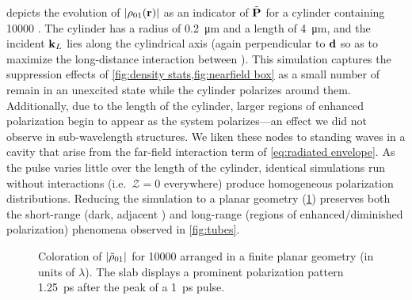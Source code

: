  depicts the evolution of $\abs{\rho_{01}(\vb{r})}$ as an indicator of $\tilde{\vb{P}}$ for a cylinder containing \num{10000} \qds{}.
The cylinder has a radius of \SI{0.2}{\micro\meter} and a length of \SI{4}{\micro\meter}, and the incident $\vb{k}_L$ lies along the cylindrical axis (again perpendicular to $\vb{d}$ so as to maximize the long-distance interaction between \qds{}).
This simulation captures the suppression effects of \cref{fig:density stats,fig:nearfield box} as a small number of \qds{} remain in an unexcited state while the cylinder polarizes around them.
Additionally, due to the length of the cylinder, larger regions of enhanced polarization begin to appear as the system polarizes---an effect we did not observe in sub-wavelength structures.
We liken these nodes to standing waves in a cavity that arise from the far-field interaction term of \cref{eq:radiated envelope}.
As the pulse varies little over the length of the cylinder, identical simulations run without interactions (i.e.~$\mathcal{Z} = 0$ everywhere) produce homogeneous polarization distributions.
Reducing the simulation to a planar geometry (\cref{fig:wide plate}) preserves both the short-range (dark, adjacent \qds{}) and long-range (regions of enhanced/diminished polarization) phenomena observed in \cref{fig:tubes}.


\begin{figure}
  \centering
  \caption{\label{fig:wide plate}
    Coloration of $\abs{\tilde{\rho}_{01}}$ for \num{10000} \qds{} arranged in a finite planar geometry (in units of $\lambda$).
    The slab displays a prominent polarization pattern \SI{1.25}{\pico\second} after the peak of a \SI{1}{\pico\second} pulse.
  }
\end{figure}

